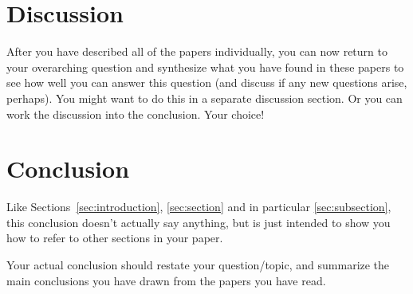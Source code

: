\documentclass[letterpaper, 11pt]{article}
\begin{document}
\section{Discussion}
\label{sec:discussion}
After you have described all of the papers individually, you can now return to your overarching question and synthesize what you have found in these papers to see how well you can answer this question (and discuss if any new questions arise, perhaps). 
You might want to do this in a separate discussion section. Or you can work the discussion into the conclusion. Your choice! 

\section{Conclusion}
\label{sec:conclusion}
Like Sections~\ref{sec:introduction}, \ref{sec:section} and in particular \ref{sec:subsection}, this conclusion doesn't actually say anything, but is just intended to show you how to refer to other sections in your paper. 

Your actual conclusion should restate your question/topic, and summarize the main conclusions you have drawn from the papers you have read. 



\end{document}

